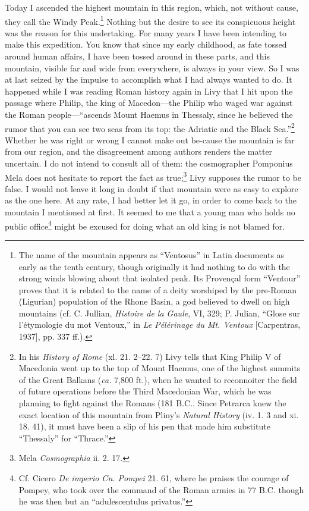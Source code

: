 Today I ascended the highest mountain in this region, which, not
without cause, they call the Windy Peak.\footnote{The name of the
mountain appears as ``Ventosus'' in Latin documents as early as the
tenth century, though originally it had nothing to do with the strong
winds blowing about that isolated peak. Its Proven\c{c}al form
``Ventour'' proves that it is related to the name of a deity worshiped
by the pre-Roman (Ligurian) population of the Rhone Basin, a god
believed to dwell on high mountains (cf. C. Jullian, \textit{Histoire
de la Gaule}, VI, 329; P. Julian, ``Glose sur l'\'{e}tymologie du mot
Ventoux,'' in \textit{Le P\'{e}l\'{e}rinage du Mt. Ventoux}
[Carpentras, 1937], pp. 337 ff.).} Nothing but the desire to see its
conspicuous height was the reason for this undertaking. For many years
I have been intending to make this expedition. You know that since my
early childhood, as fate tossed around human affairs, I have been
tossed around in these parts, and this mountain, visible far and wide
from everywhere, is always in your view. So I was at last seized by
the impulse to accomplish what I had always wanted to do. It happened
while I was reading Roman history again in Livy that I hit upon the
passage where Philip, the king of Macedon---the Philip who waged war
against the Roman people---``ascends Mount Haemus in Thessaly, since
he believed the rumor that you can see two seas from its top: the
Adriatic and the Black Sea.''\footnote{In his \textit{History of Rome}
(xl. 21. 2--22. 7) Livy tells that King Philip V of Macedonia went up
to the top of Mount Haemus, one of the highest summits of the Great
Balkans (\textit{ca.} 7,800 ft.), when he wanted to reconnoiter the
field of future operations before the Third Macedonian War, which he
was planning to fight against the Romans (181 \textsc{B.C.}. Since
Petrarca knew the exact location of this mountain from Pliny's
\textit{Natural History} (iv. 1. 3 and xi. 18. 41), it must have been
a slip of his pen that made him substitute ``Thessaly'' for
``Thrace.''} Whether he was right or wrong I cannot make out
be-cause the mountain is far from our region, and the
disagreement among authors renders the matter uncertain. I do not
intend to consult all of them: the cosmographer Pomponius Mela does
not hesitate to report the fact as true;\footnote{Mela
\textit{Cosmographia} ii. 2. 17.} Livy supposes the rumor to be false.
I would not leave it long in doubt if that mountain were as easy to
explore as the one here. At any rate, I had better let it go, in order
to come back to the mountain I mentioned at first. It seemed to me
that a young man who holds no public office\footnote{Cf. Cicero
\textit{De imperio Cn. Pompei} 21. 61, where he praises the courage of
Pompey, who took over the command of the Roman armies in 77
\textsc{B.C.} though he was then but an ``adulescentulus privatus.''}
might be excused for doing what an old king is not blamed for.

